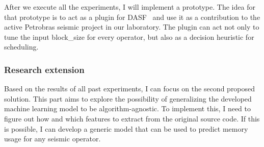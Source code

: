 After we execute all the experiments, I will implement a prototype.
The idea for that prototype is to act as a plugin for \ac{DASF}~\cite{dasf} and use it as a contribution to the active Petrobras seismic project in our laboratory.
The plugin can act not only to tune the input block\_size for every operator, but also as a decision heuristic for scheduling.

\subsubsection{Research extension}

Based on the results of all past experiments, I can focus on the second proposed solution.
This part aims to explore the possibility of generalizing the developed machine learning model to be algorithm-agnostic.
To implement this, I need to figure out how and which features to extract from the original source code.
If this is possible, I can develop a generic model that can be used to predict memory usage for any seismic operator.
